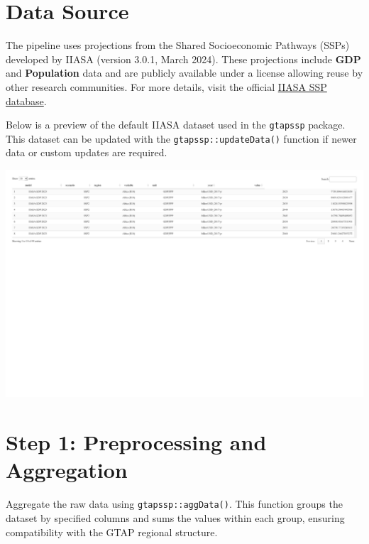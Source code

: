 \documentclass[
  letterpaper,
  DIV=11,
  numbers=noendperiod]{scrartcl}
\newenvironment{Shaded}{}{}
\newcommand{\NormalTok}[1]{\textcolor[rgb]{0.12,0.11,0.11}{#1}}
\newcommand{\SpecialCharTok}[1]{\textcolor[rgb]{0.24,0.68,0.91}{#1}}
\begin{document}
\section{Data Source}\label{data-source}

The pipeline uses projections from the Shared Socioeconomic Pathways
(SSPs) developed by IIASA (version 3.0.1, March 2024). These projections
include \textbf{GDP} and \textbf{Population} data and are publicly
available under a license allowing reuse by other research communities.
For more details, visit the official
\href{https://data.ece.iiasa.ac.at/ssp}{IIASA SSP database}.

Below is a preview of the default IIASA dataset used in the
\texttt{gtapssp} package. This dataset can be updated with the
\texttt{gtapssp::updateData()} function if newer data or custom updates
are required.

\begin{Shaded}
\end{Shaded}

\includegraphics{index_files/figure-pdf/unnamed-chunk-10-1.pdf}

\section{Step 1: Preprocessing and
Aggregation}\label{step-1-preprocessing-and-aggregation}

Aggregate the raw data using \texttt{gtapssp::aggData()}. This function
groups the dataset by specified columns and sums the values within each
group, ensuring compatibility with the GTAP regional structure.
\end{document}
